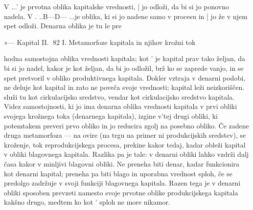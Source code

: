 \documentclass[kapital_02.tex]{subfiles}
\begin{document}
V \KPED...\KPED' je \KPED prvotna oblika kapitalske vrednosti, | jo odloži, da bi si jo ponovno nadela. V \KPEP. ..B—D— \KPEB...\KPEP je \KPED oblika, ki si jo nadene samo v procesu in | jo že v njem spet odloži. Denarna oblika je tu le pre









































































»— Kapital II. 82 I. Metamorfoze kapitala in njihov krožni tok



 hodna samostojna oblika vrednosti kapitala; kot \KPEB' je kapital prav tako željan, da bi si jo nadel, kakor je kot \KPED željan, da bi jo odložil, brž ko se zaprede vanjo, in se spet pretvoril v obliko produktivnega kapitala. Dokler vztraja v denarni podobi, ne deluje kot kapital in zato ne poveča svoje vrednosti; kapital leži neizkoriščen. \KPED služi tu kot cirkulacijsko sredstvo, vendar kot cirkulacijsko sredstvo kapitala. Videz samostojnosti, ki jo ima denarna oblika vrednosti kapitala v prvi obliki svojega krožnega toka (denarnega kapitala), izgine v'tej drugi obliki, ki potemtakem preveri prvo obliko in jo reducira zgolj na posebno obliko. Če zadene druga metamorfoza \KPED — \KPEB na ovire (na trgu na primer ni produkcijskih sredstev), se kroženje, tok reprodukcijskega procesa, prekine kakor tedaj, kadar obleži kapital v obliki blagovnega kapitala. Razlika pa je tale: v denarni obliki lahko vzdrži dalj časa kakor v minljivi blagovni obliki. Ne preneha biti denar, kadar funkcionira kot denarni kapital; preneha pa biti blago in uporabna vrednost sploh, če se predolgo zadržuje v svoji funkciji blagovnega kapitala. Razen tega je v denarni obliki sposoben prevzeti namesto svoje prvotne oblike produkcijskega kapitala kakšno drugo, medtem ko kot \KPEB' sploh ne more nikamor.
\end{document}

